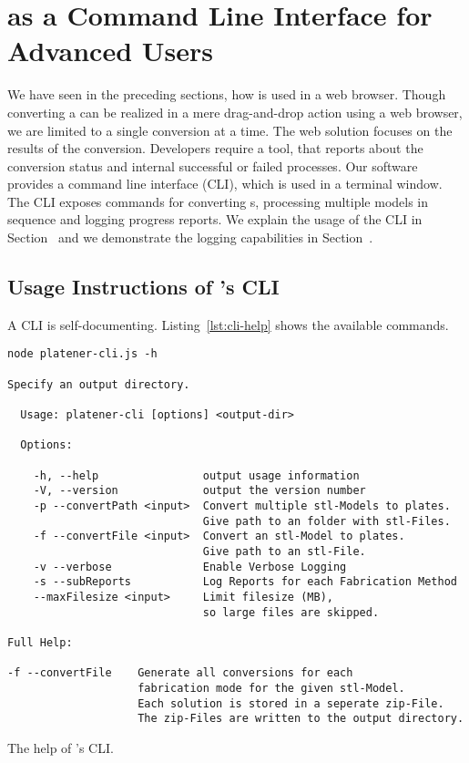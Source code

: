 \documentclass[../ClassicThesis.tex]{subfiles}
\begin{document}
\section{{\platener} as a Command Line Interface for Advanced Users}
\label{sec:walkthrough-cli}

We have seen in the preceding sections, how {\platener} is used in a
web browser.
Though converting a {\threedmodel} can be realized in a mere
drag-and-drop action using a web browser, we are limited to a single
conversion at a time. The web solution focuses on the results of the
conversion. Developers require a tool, that reports about the
conversion status and internal successful or failed processes. Our
software {\platener} provides a command line interface (CLI), which is
used in a terminal window. The CLI exposes commands for converting
{\threedmodel}s, processing multiple models in sequence and logging
progress reports. We explain the usage of the CLI in
Section~ and we demonstrate the logging
capabilities in Section~.

\subsection{Usage Instructions of {\platener}'s CLI}
\label{sec:walkthrough-cli-usage}

A CLI is self-documenting. Listing~\ref{lst:cli-help} shows the
available commands.

\begin{listing}[!h]
\begin{verbatim}
node platener-cli.js -h

Specify an output directory.

  Usage: platener-cli [options] <output-dir>

  Options:

    -h, --help                output usage information
    -V, --version             output the version number
    -p --convertPath <input>  Convert multiple stl-Models to plates.
                              Give path to an folder with stl-Files.
    -f --convertFile <input>  Convert an stl-Model to plates.
                              Give path to an stl-File.
    -v --verbose              Enable Verbose Logging
    -s --subReports           Log Reports for each Fabrication Method
    --maxFilesize <input>     Limit filesize (MB),
                              so large files are skipped.

Full Help:

-f --convertFile    Generate all conversions for each
                    fabrication mode for the given stl-Model.
                    Each solution is stored in a seperate zip-File.
                    The zip-Files are written to the output directory.
\end{verbatim}
\caption{The help of {\platener}'s CLI.}
\label{lst:cli-help}
\end{listing}
\end{document}
